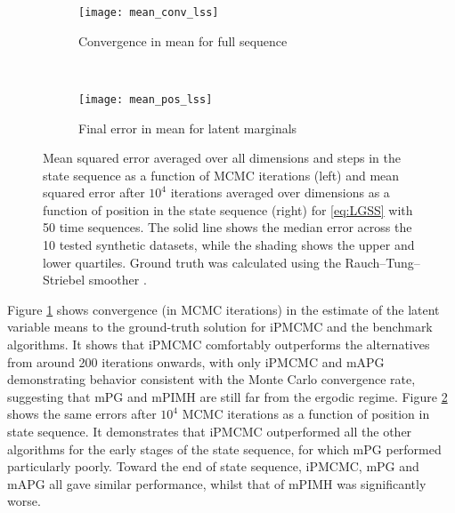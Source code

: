 \begin{figure*}[t]
	\centering
	\begin{subfigure}[t]{0.49\textwidth}
		\texttt{[image: mean\_conv\_lss]}
		\caption{Convergence in mean for full sequence}
		\label{fig:meanConv}
	\end{subfigure}
	~  %
	\begin{subfigure}[t]{0.49\textwidth}
		\texttt{[image: mean\_pos\_lss]}
		\caption{Final error in mean for latent marginals}
		\label{fig:meanPos}
	\end{subfigure}
	
	\vspace{5pt}
	\caption{Mean squared error averaged over all dimensions and steps in the state sequence as a function of MCMC iterations (left) and mean squared error after $10^4$ iterations averaged over dimensions as a function of position in the state sequence (right) for \eqref{eq:LGSS} with 50 time sequences.  The solid line shows the median error across the 10 tested synthetic datasets, while the shading shows the upper and lower quartiles.  Ground truth was calculated using the Rauch--Tung--Striebel smoother \cite{rauch1965maximum}. 
		\label{fig:groundTruth}}
\end{figure*}

Figure \ref{fig:meanConv} shows convergence (in MCMC iterations) in the estimate of the latent variable means to the ground-truth solution for iPMCMC and the benchmark algorithms.  It shows that iPMCMC comfortably outperforms the alternatives from around 200 iterations onwards, with only iPMCMC and mAPG demonstrating behavior consistent with the Monte Carlo convergence rate, suggesting that mPG and mPIMH are still far from the ergodic regime.  Figure \ref{fig:meanPos} shows the same errors after $10^4$ MCMC iterations as a function of position in state sequence.  It demonstrates that iPMCMC outperformed all the other algorithms for the early stages of the state sequence, for which mPG performed particularly poorly. Toward the end of state sequence, iPMCMC, mPG and mAPG all gave similar performance, whilst that of mPIMH was significantly worse.

